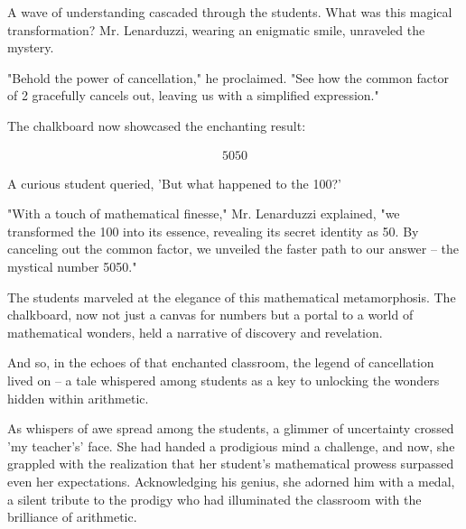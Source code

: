 \documentclass[12pt,a4paper]{article}
\begin{document}
A wave of understanding cascaded through the students. What was this magical transformation? Mr. Lenarduzzi, wearing an enigmatic smile, unraveled the mystery.

"Behold the power of cancellation," he proclaimed. "See how the common factor of 2 gracefully cancels out, leaving us with a simplified expression."

The chalkboard now showcased the enchanting result:

\begin{align*}
    \boxed{5050}
\end{align*}

A curious student queried, 'But what happened to the 100?'

"With a touch of mathematical finesse," Mr. Lenarduzzi explained, "we transformed the 100 into its essence, revealing its secret identity as 50. By canceling out the common factor, we unveiled the faster path to our answer – the mystical number 5050."

The students marveled at the elegance of this mathematical metamorphosis. The chalkboard, now not just a canvas for numbers but a portal to a world of mathematical wonders, held a narrative of discovery and revelation.

And so, in the echoes of that enchanted classroom, the legend of cancellation lived on – a tale whispered among students as a key to unlocking the wonders hidden within arithmetic.

As whispers of awe spread among the students, a glimmer of uncertainty crossed 'my teacher's' face. She had handed a prodigious mind a challenge, and now, she grappled with the realization that her student's mathematical prowess surpassed even her expectations. Acknowledging his genius, she adorned him with a medal, a silent tribute to the prodigy who had illuminated the classroom with the brilliance of arithmetic.
\end{document}
